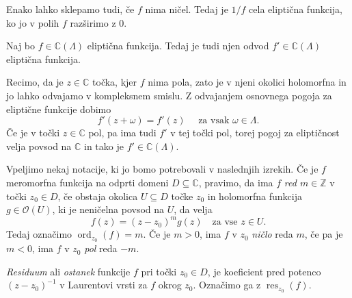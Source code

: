 \documentclass[mat1]{fmfdelo}
\numberwithin{equation}{section}
\newcommand{\Z}{\mathbb Z}
\newcommand{\C}{\mathbb C}
\newcommand{\inv}{^{-1}}
\newcommand{\torus}{\C/\Lambda}
\newcommand{\elf}{\C(\Lambda)}
\newcommand{\res}[2]{\operatorname{res}_{#1}(#2)}
\newcommand{\ord}[2]{\operatorname{ord}_{#1}(#2)}
\newcommand{\hol}[1]{\mathcal{O}(#1)}
\theoremstyle{definition}
\newenvironment{komentar}[1][Komentar]{\begin{proof}[#1]\let\qed\relax}{\end{proof}}
\begin{document}
\begin{opomba}
    Enako lahko sklepamo tudi, če $f$ nima ničel. Tedaj je $1/f$ cela eliptična funkcija, ko jo v polih $f$ razširimo z $0$.
\end{opomba}

\begin{lema}
    \label{odvod el. funkcije}
    Naj bo $f \in \elf$ eliptična funkcija. Tedaj je tudi njen odvod $f' \in \elf$ eliptična funkcija.
\end{lema}

\begin{dokaz}
    Recimo, da je $z \in \C$ točka, kjer $f$ nima pola, zato je v njeni okolici holomorfna in jo lahko odvajamo v kompleksnem smislu. Z odvajanjem osnovnega pogoja za eliptične funkcije dobimo
    \[
        f'(z + \omega) = f'(z) \quad \text{ za vsak $\omega \in \Lambda$.}
    \]
    Če je v točki $z \in \C$ pol, pa ima tudi $f'$ v tej točki pol, torej pogoj za eliptičnost velja povsod na $\C$ in tako je $f' \in \elf$.
\end{dokaz}

Vpeljimo nekaj notacije, ki jo bomo potrebovali v naslednjih izrekih. Če je $f$ meromorfna funkcija na odprti domeni $D \subseteq \C$, pravimo, da ima $f$ \emph{red $m \in \Z$} v točki $z_0 \in D$, če obstaja okolica $U \subseteq D$ točke $z_0$ in holomorfna funkcija $g \in \hol{U}$, ki je neničelna povsod na $U$, da velja 
\[
    f(z) = (z - z_0)^m g(z) \quad \text{za vse $z \in U$.}  
\]   
Tedaj označimo $\ord{z_0}{f} = m$. Če je $m > 0$, ima $f$ v $z_0$ \emph{ničlo} reda $m$, če pa je $m < 0$, ima $f$ v $z_0$ \emph{pol} reda $-m$.

\emph{Residuum} ali \emph{ostanek} funkcije $f$ pri točki $z_0 \in D$, je koeficient pred potenco $(z-z_0)\inv$ v Laurentovi vrsti za $f$ okrog $z_0$. Označimo ga z $\res{z_0}{f}$. 

\end{document}
